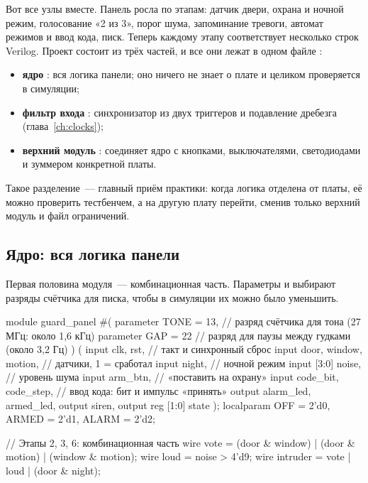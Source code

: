 Вот все узлы вместе. Панель росла по этапам: датчик двери, охрана и ночной
режим, голосование «2 из 3», порог шума, запоминание тревоги, автомат режимов
и ввод кода, писк. Теперь каждому этапу соответствует несколько строк
Verilog. Проект состоит из трёх частей, и все они лежат в одном файле
:
\begin{itemize}
  \item \textbf{ядро} : вся логика панели; оно ничего не знает
        о плате и целиком проверяется в симуляции;
  \item \textbf{фильтр входа} : синхронизатор из двух триггеров
        и подавление дребезга (глава~\ref{ch:clocks});
  \item \textbf{верхний модуль} : соединяет ядро с кнопками,
        выключателями, светодиодами и зуммером конкретной платы.
\end{itemize}
Такое разделение~--- главный приём практики: когда логика отделена от платы,
её можно проверить тестбенчем, а на другую плату перейти, сменив только верхний
модуль и файл ограничений.

\subsection{Ядро: вся логика панели}

Первая половина модуля~--- комбинационная часть. Параметры  и
 выбирают разряды счётчика для писка, чтобы в симуляции их можно было
уменьшить.

\begin{vcode}
module guard_panel #(
    parameter TONE = 13,         // разряд счётчика для тона (27 МГц: около 1,6 кГц)
    parameter GAP  = 22          // разряд для паузы между гудками (около 3,2 Гц)
) (
    input        clk, rst,                     // такт и синхронный сброс
    input        door, window, motion,         // датчики, 1 = сработал
    input        night,                        // ночной режим
    input  [3:0] noise,                        // уровень шума
    input        arm_btn,                      // «поставить на охрану»
    input        code_bit, code_step,          // ввод кода: бит и импульс «принять»
    output       alarm_led, armed_led,
    output       siren,
    output reg [1:0] state
);
    localparam OFF = 2'd0, ARMED = 2'd1, ALARM = 2'd2;

    // Этапы 2, 3, 6: комбинационная часть
    wire vote     = (door & window) | (door & motion) | (window & motion);
    wire loud     = noise > 4'd9;
    wire intruder = vote | loud | (door & night);

\end{vcode}

